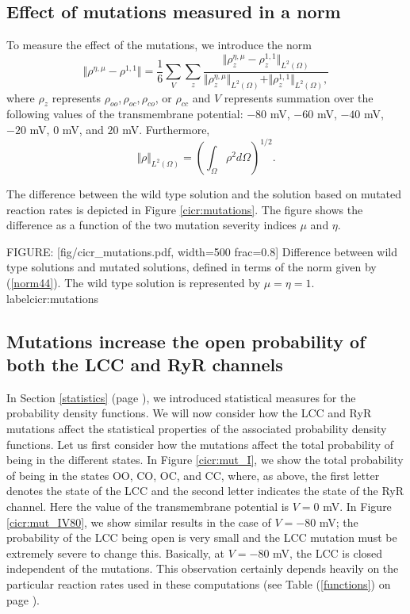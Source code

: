 \subsection{Effect of mutations measured in a norm}

To
measure the effect of the mutations, we introduce the norm
\begin{equation}
\Vert \rho^{\eta,\mu}-\rho^{1,1}\Vert=\frac{1}{6}\sum_{V} \sum_{z}\frac{\Vert\rho_z^{\eta,\mu}-\rho_z^{1,1}\Vert_{L^{2}\left(  \Omega\right)  }}{\Vert\rho_z^{\eta,\mu}\Vert_{L^{2}\left(  \Omega\right)}+\Vert\rho_z^{1,1}\Vert_{L^{2}\left(  \Omega\right)}, \label{norm44}}
\end{equation}
where $\rho_z$ represents $\rho_{oo}$,$\, \rho_{oc}$,$\, \rho_{co}$, or
$\rho_{cc}$ and $V$ represents summation over the following values of the transmembrane potential: $-80$ mV, $-60$ mV, $-40$ mV, $-20$ mV, $0$ mV, and $20$ mV. Furthermore,
\begin{equation}
\Vert\rho\Vert_{L^{2}\left(  \Omega\right)  }=\left(\int_{\Omega}\rho^2 d\Omega\right) ^{1/2}. \label{norm_rho}
\end{equation}


The difference between the wild type solution and the solution based on
mutated reaction rates is depicted in Figure \ref{cicr:mutations}.
The figure shows the difference as a function of the two mutation severity indices $\mu$ and $\eta$.


FIGURE: [fig/cicr_mutations.pdf, width=500 frac=0.8] Difference between wild type solutions and mutated solutions, defined in terms of the norm given by (\ref{norm44}). The wild type solution is represented by $\mu=\eta=1$. label{cicr:mutations}

\subsection{Mutations increase the open probability of both the LCC and RyR channels}

In Section \ref{statistics} (page \pageref{statistics}), we introduced statistical measures for the probability density functions. We will now consider how the LCC and RyR mutations affect the statistical properties of the associated probability density functions. Let us first consider how the mutations affect the total probability of being in the different states. In Figure \ref{cicr:mut_I}, we show the total probability of being in the states OO, CO, OC, and CC, where, as above, the first letter denotes the state of the LCC and the second letter indicates the state of the RyR channel. Here the value of the transmembrane potential is $V=0$ mV.
In  Figure \ref{cicr:mut_IV80}, we show similar results in the case of $V=-80$ mV; the probability of the LCC being open is very small and the LCC mutation must be extremely severe to change this. Basically, at $V=-80$ mV, the LCC is closed independent of the mutations. This observation certainly depends heavily on the particular reaction rates used in these computations (see Table (\ref{functions}) on page \pageref{functions}).



